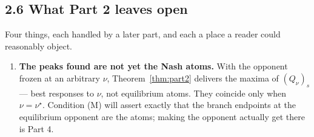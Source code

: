 \documentclass[11pt]{article}
\theoremstyle{definition}
\begin{document}
\subsection*{2.6 What Part 2 leaves open}

Four things, each handled by a later part, and each a place a reader could
reasonably object.

\begin{enumerate}[leftmargin=1.4em]
\item \textbf{The peaks found are not yet the Nash atoms.} With the opponent
  frozen at an arbitrary $\nu$, Theorem~\ref{thm:part2} delivers the maxima of
  $(Q_\nu)_s$ --- best responses to $\nu$, not equilibrium atoms. They coincide
  only when $\nu = \nu^\star$. Condition (M) will assert exactly that the branch
  endpoints at the equilibrium opponent are the atoms; making the opponent
  actually get there is Part 4.


\end{enumerate}
\end{document}
